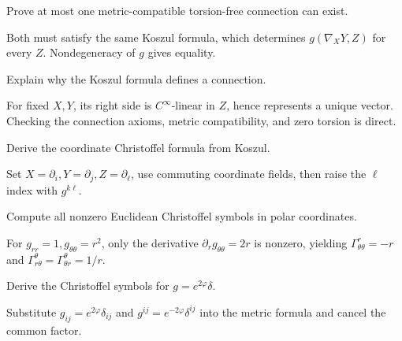 \begin{problem}\label{prob:vii22-02}
Prove at most one metric-compatible torsion-free connection can exist.
\end{problem}
\begin{solution}
Both must satisfy the same Koszul formula, which determines \(g(\nabla_XY,Z)\) for every \(Z\). Nondegeneracy of \(g\) gives equality.
\end{solution}


\begin{problem}\label{prob:vii22-03}
Explain why the Koszul formula defines a connection.
\end{problem}
\begin{solution}
For fixed \(X,Y\), its right side is \(C^\infty\)-linear in \(Z\), hence represents a unique vector. Checking the connection axioms, metric compatibility, and zero torsion is direct.
\end{solution}


\begin{problem}\label{prob:vii22-04}
Derive the coordinate Christoffel formula from Koszul.
\end{problem}
\begin{solution}
Set \(X=\partial_i,Y=\partial_j,Z=\partial_\ell\), use commuting coordinate fields, then raise the \(\ell\) index with \(g^{k\ell}\).
\end{solution}


\begin{problem}\label{prob:vii22-05}
Compute all nonzero Euclidean Christoffel symbols in polar coordinates.
\end{problem}
\begin{solution}
For \(g_{rr}=1,g_{\theta\theta}=r^2\), only the derivative \(\partial_r g_{\theta\theta}=2r\) is nonzero, yielding \(\Gamma^r_{\theta\theta}=-r\) and \(\Gamma^\theta_{r\theta}=\Gamma^\theta_{\theta r}=1/r\).
\end{solution}


\begin{problem}\label{prob:vii22-06}
Derive the Christoffel symbols for \(g=e^{2\varphi}\delta\).
\end{problem}
\begin{solution}
Substitute \(g_{ij}=e^{2\varphi}\delta_{ij}\) and \(g^{ij}=e^{-2\varphi}\delta^{ij}\) into the metric formula and cancel the common factor.
\end{solution}


